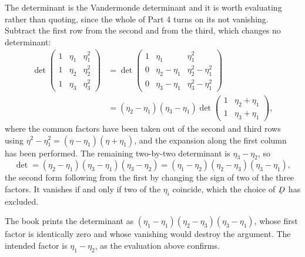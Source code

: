 The determinant is the Vandermonde determinant and it is worth
evaluating rather than quoting, since the whole of Part 4 turns on its
not vanishing. Subtract the first row from the second and from the
third, which changes no determinant:
\[
\begin{aligned}
   \det\begin{pmatrix}
      1&\eta_{1}&\eta_{1}^{2}\\
      1&\eta_{2}&\eta_{2}^{2}\\
      1&\eta_{3}&\eta_{3}^{2}\end{pmatrix}
   &=\det\begin{pmatrix}
      1&\eta_{1}&\eta_{1}^{2}\\
      0&\eta_{2}-\eta_{1}&\eta_{2}^{2}-\eta_{1}^{2}\\
      0&\eta_{3}-\eta_{1}&\eta_{3}^{2}-\eta_{1}^{2}\end{pmatrix}\\[3pt]
   &=(\eta_{2}-\eta_{1})(\eta_{3}-\eta_{1})
    \det\begin{pmatrix}1&\eta_{2}+\eta_{1}\\
                       1&\eta_{3}+\eta_{1}\end{pmatrix},
\end{aligned}
\]
where the common factors have been taken out of the second and third
rows using $\eta^{2}-\eta_{1}^{2}=(\eta-\eta_{1})(\eta+\eta_{1})$, and
the expansion along the first column has been performed. The remaining
two-by-two determinant is $\eta_{3}-\eta_{2}$, so
\[
   \det=(\eta_{2}-\eta_{1})(\eta_{3}-\eta_{1})(\eta_{3}-\eta_{2})
   =(\eta_{1}-\eta_{2})(\eta_{2}-\eta_{3})(\eta_{3}-\eta_{1}),
\]
the second form following from the first by changing the sign of two of
the three factors. It vanishes if and only if two of the $\eta_{i}$
coincide, which the choice of $\bD$ has excluded.

\begin{remark}\label{rem:ch9mis35}
The book prints the determinant as
$(\eta_{1}-\eta_{1})(\eta_{2}-\eta_{3})(\eta_{3}-\eta_{1})$, whose first
factor is identically zero and whose vanishing would destroy the
argument. The intended factor is $\eta_{1}-\eta_{2}$, as the evaluation
above confirms.
\end{remark}

